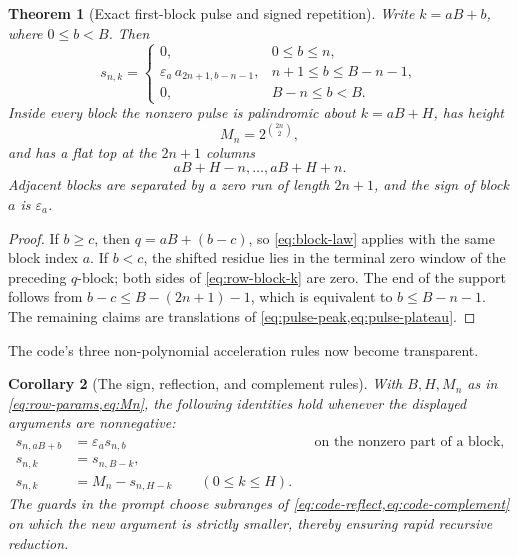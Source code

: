 \documentclass[11pt]{article}
\newtheorem{theorem}{Theorem}[section]
\newtheorem{corollary}[theorem]{Corollary}
\theoremstyle{definition}
\theoremstyle{remark}
\newcommand{\eps}{\varepsilon}
\begin{document}
\begin{theorem}[Exact first-block pulse and signed repetition]
Write \(k=aB+b\), where \(0\leq b<B\).  Then
\begin{equation}
 s_{n,k}=
 \begin{cases}
 0, & 0\leq b\leq n,\\
 \eps_a\,a_{2n+1,b-n-1},&n+1\leq b\leq B-n-1,\\
 0,&B-n\leq b<B.
 \end{cases}                                               \label{eq:row-block-k}
\end{equation}
Inside every block the nonzero pulse is palindromic about \(k=aB+H\), has
height
\begin{equation}
 M_n=2^{\binom{2n}{2}},                                    \label{eq:Mn}
\end{equation}
and has a flat top at the \(2n+1\) columns
\begin{equation}
 aB+H-n,\ldots,aB+H+n.                                    \label{eq:row-plateau}
\end{equation}
Adjacent blocks are separated by a zero run of length \(2n+1\), and the
sign of block \(a\) is \(\eps_a\).
\end{theorem}

\begin{proof}
If \(b\geq c\), then
\(q=aB+(b-c)\), so \cref{eq:block-law} applies with the same block index
\(a\).  If \(b<c\), the shifted residue lies in the terminal zero window of
the preceding \(q\)-block; both sides of \cref{eq:row-block-k} are zero.
The end of the support follows from
\(b-c\leq B-(2n+1)-1\), which is equivalent to
\(b\leq B-n-1\).  The remaining claims are translations of
\cref{eq:pulse-peak,eq:pulse-plateau}.
\end{proof}

The code's three non-polynomial acceleration rules now become transparent.

\begin{corollary}[The sign, reflection, and complement rules]
With \(B,H,M_n\) as in \cref{eq:row-params,eq:Mn}, the following identities
hold whenever the displayed arguments are nonnegative:
\begin{align}
 s_{n,aB+b}&=\eps_a s_{n,b} &&\text{on the nonzero part of a block},
                                                               \label{eq:code-sign}\\
 s_{n,k}&=s_{n,B-k},                                           \label{eq:code-reflect}\\
 s_{n,k}&=M_n-s_{n,H-k}\qquad(0\leq k\leq H).                       \label{eq:code-complement}
\end{align}
The guards in the prompt choose subranges of
\cref{eq:code-reflect,eq:code-complement} on which the new argument is
strictly smaller, thereby ensuring rapid recursive reduction.
\end{corollary}
\end{document}
